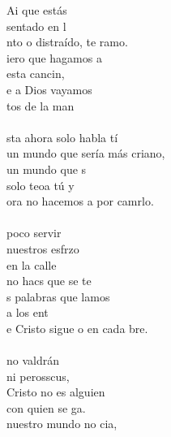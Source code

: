 \begin{cancion}%
	Ai que estás \\
	sentado en l     \\
	nto o distraído, te ramo.\\
	iero que hagamos a \\
	esta cancin,\\
	e a Dios vayamos \\
	tos de la man\\
\jump\\
	sta ahora solo habla tí\\
	un mundo que sería más criano,\\
	 un mundo que s  \\
	solo teoa tú y \\
	ora no hacemos a por camrlo.\\
\jump\\
	 poco servir \\
	nuestros esfrzo\\
	en la calle \\
	no hacs que se te\\
	s palabras que lamos \\
	a los ent\\
	e Cristo sigue o en cada bre.\\
\jump\\
	 no valdrán \\
	ni perosscus, \\
	 Cristo no es alguien \\
	con quien se ga.\\
	 nuestro mundo no cia, \\

\end{cancion}
